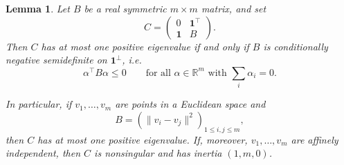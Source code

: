 \documentclass[12pt]{amsart}
\newtheorem{lemma}[theorem]{Lemma}
\theoremstyle{definition}
\newcommand{\1}{\mathbf{1}}
\newcommand\R{{\mathbb R}}
\begin{document}
\begin{lemma}
\label{lem:squared-edm-block}
Let $B$ be a real symmetric $m\times m$ matrix, and set
\[
        C=
        \begin{pmatrix}
        0&\1^\top\\
        \1&B
        \end{pmatrix}.
\]
Then $C$ has at most one positive eigenvalue if and only if $B$ is
conditionally negative semidefinite on $\1^\perp$, i.e.
\[
        \alpha^\top B\alpha\le 0
        \qquad\text{for all }\alpha\in\R^m\text{ with }\sum_i\alpha_i=0.
\]

In particular, if $v_1,\dots,v_m$ are points in a Euclidean space and
\[
        B=(\|v_i-v_j\|^2)_{1\le i,j\le m},
\]
then $C$ has at most one positive eigenvalue.  
If, moreover, $v_1,\dots,v_m$ are affinely independent, then $C$ is nonsingular and
has inertia $(1,m,0)$.
\end{lemma}
\end{document}
